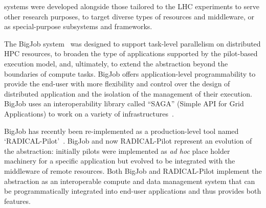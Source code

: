 \documentclass{sig-alternate}
\begin{document}
\pilotjob systems were developed alongside those tailored to the LHC
experiments to serve other research purposes, to target diverse types of
resources and middleware, or as special-purpose subsystems and frameworks.

The BigJob \pilotjob system~\cite{luckow2010} was designed to support task-level
parallelism on distributed HPC resources, to broaden the type of applications
supported by the pilot-based execution model, and, ultimately, to extend the
\pilot abstraction beyond the boundaries of compute tasks. BigJob offers
application-level programmability to provide the end-user with more flexibility
and control over the design of distributed application and the isolation of the
management of their execution. BigJob uses an interoperability library called
``SAGA'' (Simple API for Grid Applications) to work on a variety of
infrastructures~\cite{merzky2015saga,goodale2006,luckow2010}.




BigJob has recently been re-implemented as a production-level tool named
`RADICAL-Pilot'~\cite{merzky2015radical}. BigJob and now RADICAL-Pilot represent
an evolution of the \pilot abstraction: initially pilots were implemented as
\textit{ad hoc} place holder machinery for a specific application but evolved to
be integrated with the middleware of remote resources. Both BigJob and
RADICAL-Pilot implement the \pilot abstraction as an interoperable compute and
data management system that can be programmatically integrated into end-user
applications and thus provides both features.

\end{document}
